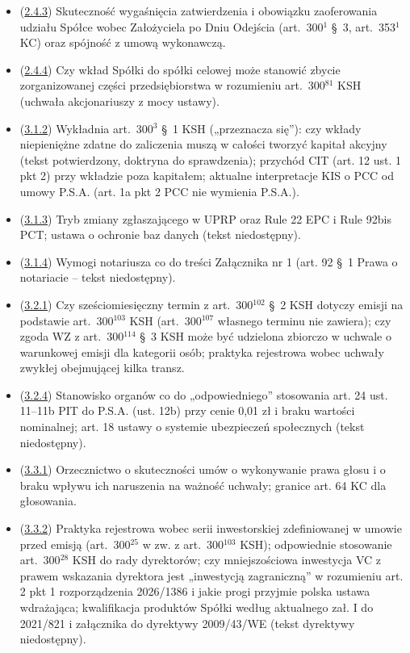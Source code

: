 \documentclass[12pt,a4paper]{report}
\begin{document}
\begin{itemize}
  \item (\hyperref[memo:2.4.3]{2.4.3}) Skuteczność wygaśnięcia zatwierdzenia i obowiązku zaoferowania udziału Spółce wobec Założyciela po Dniu Odejścia (art.~300$^{1}$ §~3, art.~353$^{1}$ KC) oraz spójność z umową wykonawczą.
  \item (\hyperref[memo:2.4.4]{2.4.4}) Czy wkład Spółki do spółki celowej może stanowić zbycie zorganizowanej części przedsiębiorstwa w rozumieniu art.~300$^{81}$ KSH (uchwała akcjonariuszy z mocy ustawy).
  \item (\hyperref[memo:3.1.2]{3.1.2}) Wykładnia art.~300$^{3}$ §~1 KSH („przeznacza się”): czy wkłady niepieniężne zdatne do zaliczenia muszą w całości tworzyć kapitał akcyjny (tekst potwierdzony, doktryna do sprawdzenia); przychód CIT (art. 12 ust. 1 pkt 2) przy wkładzie poza kapitałem; aktualne interpretacje KIS o PCC od umowy P.S.A. (art. 1a pkt 2 PCC nie wymienia P.S.A.).
  \item (\hyperref[memo:3.1.3]{3.1.3}) Tryb zmiany zgłaszającego w UPRP oraz Rule 22 EPC i Rule 92bis PCT; ustawa o ochronie baz danych (tekst niedostępny).
  \item (\hyperref[memo:3.1.4]{3.1.4}) Wymogi notariusza co do treści Załącznika nr 1 (art. 92 §~1 Prawa o notariacie – tekst niedostępny).
  \item (\hyperref[memo:3.2.1]{3.2.1}) Czy sześciomiesięczny termin z art.~300$^{102}$ §~2 KSH dotyczy emisji na podstawie art.~300$^{103}$ KSH (art.~300$^{107}$ własnego terminu nie zawiera); czy zgoda WZ z art.~300$^{114}$ §~3 KSH może być udzielona zbiorczo w uchwale o warunkowej emisji dla kategorii osób; praktyka rejestrowa wobec uchwały zwykłej obejmującej kilka transz.
  \item (\hyperref[memo:3.2.4]{3.2.4}) Stanowisko organów co do „odpowiedniego” stosowania art. 24 ust. 11–11b PIT do P.S.A. (ust. 12b) przy cenie 0,01 zł i braku wartości nominalnej; art. 18 ustawy o systemie ubezpieczeń społecznych (tekst niedostępny).
  \item (\hyperref[memo:3.3.1]{3.3.1}) Orzecznictwo o skuteczności umów o wykonywanie prawa głosu i o braku wpływu ich naruszenia na ważność uchwały; granice art. 64 KC dla głosowania.
  \item (\hyperref[memo:3.3.2]{3.3.2}) Praktyka rejestrowa wobec serii inwestorskiej zdefiniowanej w umowie przed emisją (art.~300$^{25}$ w zw. z art.~300$^{103}$ KSH); odpowiednie stosowanie art.~300$^{28}$ KSH do rady dyrektorów; czy mniejszościowa inwestycja VC z prawem wskazania dyrektora jest „inwestycją zagraniczną” w rozumieniu art. 2 pkt 1 rozporządzenia 2026/1386 i jakie progi przyjmie polska ustawa wdrażająca; kwalifikacja produktów Spółki według aktualnego zał. I do 2021/821 i załącznika do dyrektywy 2009/43/WE (tekst dyrektywy niedostępny).

\end{itemize}
\end{document}
